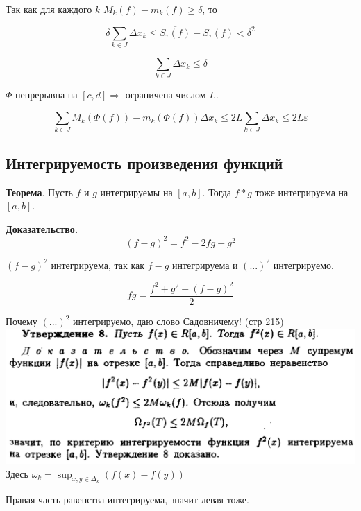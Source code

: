 \documentclass[a4paper]{article}
\begin{document}
\begin{definit}
\begin{hproof}
\begin{enumerate}
Так как для каждого $k$ $M_k(f) - m_k(f) \geq \delta$, то

\[
 \delta \sum_{k \in J} \Delta x_k \leq \overline{S_\tau(f)} - \underline{S_\tau(f)} < \delta^2
\]

\[
\sum_{k \in J} \Delta x_k \leq \delta
\]

$\Phi$ непрерывна на $[c,d] \Rightarrow$ ограничена числом $L$.

\[
\sum_{k \in J} M_k(\Phi(f)) - m_k(\Phi(f)) \Delta x_k \leq 2L \sum_{k \in J} \Delta x_k  \leq 2L\varepsilon
\]

\end{enumerate}
\end{hproof}


\end{definit}

\begin{definit}
\hypertarget{p11}{}
\subsection*{Интегрируемость произведения функций}

\begin{htheorem}\textbf{Теорема}.
Пусть $f$ и $g$ интегрируемы на $[a,b]$. Тогда $f*g$ тоже интегрируема на $[a,b]$.

\end{htheorem}


\begin{hproof}\textbf{Доказательство.}
\[
(f-g)^2 = f^2 - 2fg + g^2
\]

$(f-g)^2$ интегрируема, так как $f-g$ интегрируема и $(...)^2$ интегрируемо.

\[
fg = \frac{f^2 + g^2 - (f-g)^2}{2}
\]

Почему $(...)^2$ интегрируемо, даю слово Садовничему! (стр 215)
\includegraphics[width=16cm]{sadovnichy1.png}
Здесь $\omega_k = \sup_{x,y \in \Delta_k} (f(x)-f(y))$

Правая часть равенства интегрируема, значит левая тоже.
\end{hproof}
\end{definit}
\end{document}
